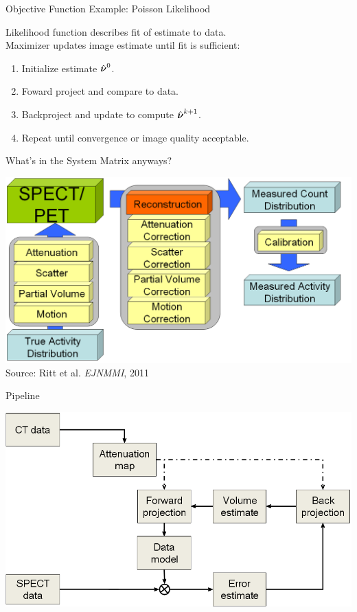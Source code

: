 \begin{frame}{Objective Function Example: Poisson Likelihood}
    \raggedright
    Likelihood function describes fit of estimate to data. \\[0.2cm]
    Maximizer updates image estimate until fit is sufficient:
    \begin{enumerate}
        \item{Initialize estimate $\hat{\text{\boldmath$\nu$}}^{0}$.}
        \item{Foward project and compare to data.}
        \item{Backproject and update to compute $\hat{\text{\boldmath$\nu$}}^{k+1}$.}
        \item{Repeat until convergence or image quality acceptable.}
    \end{enumerate}

\end{frame}

\begin{frame}{What's in the System Matrix anyways?}
    \begin{center}\includegraphics[height=0.75\textheight]{images/Image_Formation}\\
        {\scriptsize Source: Ritt et al. \emph{EJNMMI}, 2011}\\
    \end{center}
\end{frame}


\begin{frame}{Pipeline}
    \begin{center}
        \includegraphics[height=0.8\textheight]{images/iterative_recon}\\
    \end{center}
\end{frame}



